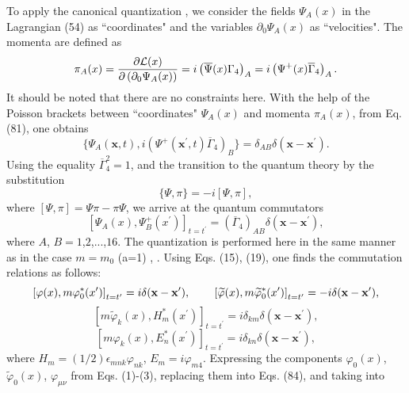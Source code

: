 \documentclass[a4paper,12pt]{article}
\begin{document}
To apply the canonical quantization \cite{Dirac}, we consider the
fields $\Psi_A (x)$ in the Lagrangian (54) as ``coordinates" and
the variables $\partial_0\Psi_A (x)$ as ``velocities". The momenta
are defined as
\begin{equation}
\pi_A (x)=\frac{\partial {\cal L}(x)}{\partial \left(\partial_0
\Psi_A (x)\right)}=i\left(\overline{\Psi }(x)\Gamma_4 \right)_A=
i\left(\Psi^+ (x)\overline{\Gamma}_4 \right)_A  .\label{81}
\end{equation}
It should be noted that there are no constraints here. With the
help of the Poisson brackets between ``coordinates" $\Psi_A (x)$
and momenta $\pi_A (x)$, from Eq. (81), one obtains
\begin{equation}
\{\Psi_A (\mathbf{x},t),i\left(\Psi^+ (\mathbf{x}^{\prime }
,t)\overline{\Gamma}_4 \right)_B
\}=\delta_{AB}\delta\left(\mathbf{x}- \mathbf{x}^{\prime }\right)
. \label{82}
\end{equation}
Using the equality $\overline{\Gamma}_4^2 =1$, and the transition
to the quantum theory by the substitution
\[
\{\Psi ,\pi \} =-i\left[\Psi,\pi \right] ,
\]
where $\left[\Psi,\pi \right]= \Psi\pi -\pi \Psi$, we arrive at
the quantum commutators
\begin{equation}
\left[ \Psi _A(x),\Psi^+ _B(x^{\prime })\right] _{t=t^{\prime
}}=\left( \overline{\Gamma} _4\right) _{AB}\delta
(\mathbf{x}-\mathbf{x}^{\prime }) ,\label{83}
\end{equation}
where $A$, $B=1$,$2$,...,$16$. The quantization is performed here
in the same manner as in the case $m=m_0$ (a=1) \cite{Kruglov1},
\cite{monogr}. Using Eqs. (15), (19), one finds the commutation
relations as follows:
\[
\left[ \varphi (x),m\varphi _0^{*}(x^{\prime })\right]
_{t=t^{\prime }}=i\delta (\mathbf{x}-\mathbf{x}^{\prime }) ,
\hspace{0.3in}\left[ \widetilde{ \varphi }(x),m\widetilde{\varphi
}_0^{*}(x^{\prime })\right] _{t=t^{\prime }}=-i\delta
(\mathbf{x}-\mathbf{x}^{\prime }) ,
\]
\begin{equation}
\left[ m\widetilde{\varphi }_k(x),H _{m}^{*}(x^{\prime })\right]
_{t=t^{\prime }}=i\delta _{km}\delta
(\mathbf{x}-\mathbf{x}^{\prime }) ,\label{84}
\end{equation}
\[
\left[ m\varphi _k(x),E_{n}^{*}(x^{\prime })\right] _{t=t^{\prime
}}=i\delta _{kn}\delta (\mathbf{x}-\mathbf{x}^{\prime }) ,
\]
where $H _{m}=(1/2)\epsilon_{mnk}\varphi_{nk}$, $E_m
=i\varphi_{m4}$. Expressing the components $\varphi_0 (x)$,
$\widetilde{ \varphi }_0(x)$, $\varphi_{\mu\nu}$ from Eqs.
(1)-(3), replacing them into Eqs. (84), and taking into
\end{document}
